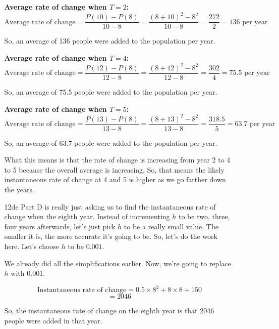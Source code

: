 \documentclass{article}
\begin{document}
\begin{itemize}
\begin{enumerate}
\textbf{Average rate of change when \( T = 2 \):}
\[ \text{Average rate of change} = \frac{P(10) - P(8)}{10 - 8} = \frac{(8 + 10)^2 - 8^2}{10 - 8} = \frac{272}{2} = 136 \text{ per year} \]

So, an average of 136 people were added to the population per year.

\textbf{Average rate of change when \( T = 4 \):}
\[ \text{Average rate of change} = \frac{P(12) - P(8)}{12 - 8} = \frac{(8 + 12)^2 - 8^2}{12 - 8} = \frac{302}{4} = 75.5 \text{ per year} \]

So, an average of 75.5 people were added to the population per year.

\textbf{Average rate of change when \( T = 5 \):}
\[ \text{Average rate of change} = \frac{P(13) - P(8)}{13 - 8} = \frac{(8 + 13)^2 - 8^2}{13 - 8} = \frac{318.5}{5} = 63.7 \text{ per year} \]

So, an average of 63.7 people were added to the population per year.

What this means is that the rate of change is increasing from year 2 to 4 to 5 because the overall average is increasing. So, that means the likely instantaneous rate of change at 4 and 5 is higher as we go farther down the years.
    \item[12de] Part D is really just asking us to find the instantaneous rate of change when the eighth year. Instead of incrementing \( h \) to be two, three, four years afterwards, let's just pick \( h \) to be a really small value. The smaller it is, the more accurate it's going to be. So, let's do the work here. Let's choose \( h \) to be \( 0.001 \). 

We already did all the simplifications earlier. Now, we're going to replace \( h \) with \( 0.001 \). 

\[ \text{Instantaneous rate of change} = 0.5 \times 8^2 + 8 \times 8 + 150 \]
\[ = 2046 \]

So, the instantaneous rate of change on the eighth year is that 2046 people were added in that year.

\end{enumerate}
\end{itemize}
\end{document}
